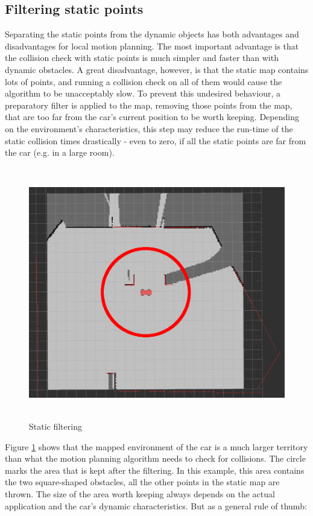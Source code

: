 \subsection{Filtering static points}
Separating the static points from the dynamic objects has both advantages and disadvantages for local motion planning. The most important advantage is that the collision check with static points is much simpler and faster than with dynamic obstacles. A great disadvantage, however, is that the static map contains lots of points, and running a collision check on all of them would cause the algorithm to be unacceptably slow. To prevent this undesired behaviour, a preparatory filter is applied to the map, removing those points from the map, that are too far from the car's current position to be worth keeping. Depending on the environment's characteristics, this step may reduce the run-time of the static collision times drastically - even to zero, if all the static points are far from the car (e.g. in a large room).

\begin{figure}[!ht]
    \centering
    \includegraphics[height=110mm]{figures/raw/rviz_2_near_static_objects_filter.png}
    \caption{Static filtering}
    \label{rviz_2_near_static_objects_filter}
\end{figure}

Figure \ref{rviz_2_near_static_objects_filter} shows that the mapped environment of the car is a much larger territory than what the motion planning algorithm needs to check for collisions. The circle marks the area that is kept after the filtering. In this example, this area contains the two square-shaped obstacles, all the other points in the static map are thrown. The size of the area worth keeping always depends on the actual application and the car's dynamic characteristics. But as a general rule of thumb:

